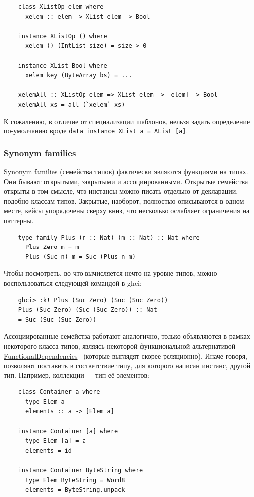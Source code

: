 \begin{verbatim}
    class XListOp elem where
      xelem :: elem -> XList elem -> Bool

    instance XListOp () where
      xelem () (IntList size) = size > 0

    instance XList Bool where
      xelem key (ByteArray bs) = ...

    xelemAll :: XListOp elem => XList elem -> [elem] -> Bool
    xelemAll xs = all (`xelem` xs)
\end{verbatim}

К сожалению, в отличие от специализации шаблонов, нельзя задать определение по-умолчанию вроде \texttt{data instance XList a = AList [a]}.

\subsubsection{Synonym families}

Synonym families (семейства типов) фактически являются функциями на типах.
Они бывают открытыми, закрытыми и ассоциированными.
Открытые семейства открыты в том смысле, что инстансы можно писать отдельно от декларации, подобно классам типов.
Закрытые, наоборот, полностью описываются в одном месте, кейсы упорядочены сверху вниз, что несколько ослабляет ограничения на паттерны.

\begin{verbatim}
    type family Plus (n :: Nat) (m :: Nat) :: Nat where
      Plus Zero m = m
      Plus (Suc n) m = Suc (Plus n m)
\end{verbatim}

Чтобы посмотреть, во что вычисляется нечто на уровне типов, можно воспользоваться следующей командой в ghci:
\begin{verbatim}
    ghci> :k! Plus (Suc Zero) (Suc (Suc Zero))
    Plus (Suc Zero) (Suc (Suc Zero)) :: Nat
    = Suc (Suc (Suc Zero))
\end{verbatim}

Ассоциированные семейства работают аналогично, только объявляются в рамках некоторого класса типов, являясь некоторой функциональной альтернативой \href{https://ghc.gitlab.haskell.org/ghc/doc/users_guide/exts/functional_dependencies.html}{FunctionalDependencies}\ \cite{jones2000type} (которые выглядят скорее реляционно).
Иначе говоря, позволяют поставить в соответствие типу, для которого написан инстанс, другой тип.
Например, коллекции --- тип её элементов:

\begin{verbatim}
    class Container a where
      type Elem a
      elements :: a -> [Elem a]

    instance Container [a] where
      type Elem [a] = a
      elements = id

    instance Container ByteString where
      type Elem ByteString = Word8
      elements = ByteString.unpack
\end{verbatim}

